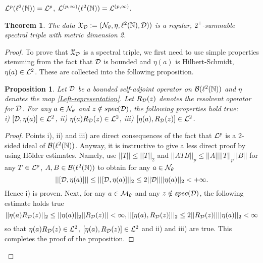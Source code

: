\documentclass[a4paper,11pt,twoside]{article}
\numberwithin{equation}{section}
\newtheorem{theorem}[Theorem]{Theorem}
\newtheorem{proposition}[Theorem]{Proposition}
\theoremstyle{nonumberplain}
\newtheorem{proof}{Proof}
\newcounter{and}
\begin{document}
${\cal{L}}^p(\ell^2(\mathbb{N}))={\cal{L}}^p$, ${\cal{L}}^{(p,\infty)}(\ell^2(\mathbb{N}))={\cal{L}}^{(p,\infty)}$.
\begin{theorem}\label{th1}
The data $\mathfrak{X}_{{\cal{D}}}:=({\cal{N}}_\theta,\eta,\ell^2(\mathbb{N}), {\cal{D}}))$ is a regular, $2^+$-summable spectral triple with metric dimension 2.
\end{theorem}
\begin{proof}
To prove that $\mathfrak{X}_{{\cal{D}}}$ is a spectral triple, we first need to use simple properties stemming from the fact that ${\cal{D}}$ is bounded and $\eta(a)$ is Hilbert-Schmidt, $\eta(a)\in{\cal{L}}^2$. These are collected into the following proposition.
\begin{proposition}\label{technical-propert}
Let ${\cal{D}}$ be a bounded self-adjoint operator on ${\cal{B}}(\ell^2(\mathbb{N}))$ and $\eta$ denotes the map \eqref{Left-representation}. Let $R_{\cal{D}}(z)$ denotes the resolvent operator for ${\cal{D}}$.  For any $a\in{\cal{N}}_\theta$ and $z\notin spec({\cal{D}})$, the following properties hold true:\\
i) $[{\cal{D}},\eta(a)]\in{\cal{L}}^2$, ii) $\eta(a)R_{\cal{D}}(z)\in{\cal{L}}^2$, iii) $[\eta(a),R_{\cal{D}}(z)]\in{\cal{L}}^2$.
\end{proposition}
\begin{proof}
Points i), ii) and iii) are direct consequences of the fact that ${\cal{L}}^p$ is a 2-sided ideal of ${\cal{B}}(\ell^2(\mathbb{N}))$. Anyway, it is instructive to give a less direct proof by using H\"older estimates. Namely, use $||T||\le||T||_2$ and $||ATB||_p\le||A||||T||_p||B||$ for any $T\in{\cal{L}}^p$, $A,B\in{\cal{B}}(\ell^2(\mathbb{N}))$ to obtain for any $a\in{\cal{N}}_\theta$
\begin{equation}
||[{\cal{D}},\eta(a)]||\le||[{\cal{D}},\eta(a)]||_2\le2||{\cal{D}}||||\eta(a)||_2<+\infty\label{estimate-triple11}.
\end{equation}
Hence i) is proven. Next, for any $a\in{\cal{M}}_\theta$ and any $z\notin spec({\cal{D}})$, the following estimate holds true
\begin{equation}
||\eta(a)R_{\cal{D}}(z)||_2\le||\eta(a)||_2||R_{\cal{D}}(z)||<\infty, ||[\eta(a),R_{\cal{D}}(z)]||_2\le2||R_{\cal{D}}(z)||||\eta(a)||_2<\infty\label{estimate-triple22}
\end{equation}
so that $\eta(a)R_{{\cal{D}}}(z)\in{\cal{L}}^2$, $[\eta(a),R_{\cal{D}}(z)]\in{\cal{L}}^2$ and ii) and iii) are true. 
This completes the proof of the proposition.
\end{proof}


\end{proof}
\end{document}
